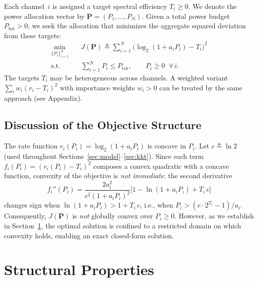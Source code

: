 \documentclass[journal]{IEEEtran}
\begin{document}
Each channel~$i$ is assigned a target spectral efficiency $T_i \ge 0$.
We denote the power allocation vector by $\bm{P} = (P_1, \ldots, P_N)$.
Given a total power budget $P_{\mathrm{tot}} > 0$, we seek the allocation that minimizes the aggregate squared deviation from these targets:
\begin{equation}
\begin{aligned}
\min_{\{P_i\}_{i=1}^N}\quad & J(\bm{P}) \triangleq \sum_{i=1}^{N}\Big(\log_2(1+a_iP_i)-T_i\Big)^2 \\
\text{s.t.}\quad & \sum_{i=1}^{N} P_i \le P_{\mathrm{tot}}, \qquad P_i\ge 0\;\;\forall\, i.
\end{aligned}
\label{eq:main}
\end{equation}
The targets $T_i$ may be heterogeneous across channels.
A weighted variant $\sum_i w_i(r_i - T_i)^2$ with importance weights $w_i > 0$ can be treated by the same approach (see Appendix).

\subsection{Discussion of the Objective Structure}

The rate function $r_i(P_i) = \log_2(1 + a_i P_i)$ is concave in $P_i$.
Let $c \triangleq \ln 2$ (used throughout Sections~\ref{sec:model}--\ref{sec:kkt}).
Since each term $f_i(P_i) = (r_i(P_i) - T_i)^2$ composes a convex quadratic with a concave function, convexity of the objective is \emph{not immediate}: the second derivative
\begin{equation}
f_i''(P_i) = \frac{2a_i^2}{c^2(1+a_iP_i)^2}\Big[1 - \ln(1+a_iP_i) + T_i\, c\Big]
\label{eq:secondderiv}
\end{equation}
changes sign when $\ln(1 + a_i P_i) > 1 + T_i\, c$, i.e., when $P_i > (e \cdot 2^{T_i} - 1)/a_i$.
Consequently, $J(\bm{P})$ is \emph{not} globally convex over $P_i \ge 0$.
However, as we establish in Section~\ref{sec:properties}, the optimal solution is confined to a restricted domain on which convexity holds, enabling an exact closed-form solution.

\section{Structural Properties}
\label{sec:properties}
\end{document}
